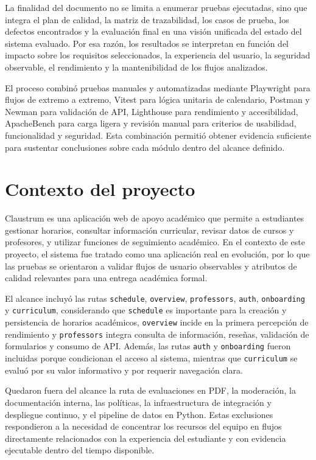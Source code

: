 \documentclass[11pt,spanish]{article}
\begin{document}
La finalidad del documento no se limita a enumerar pruebas ejecutadas, sino que integra el plan de calidad, la matriz de trazabilidad, los casos de prueba, los defectos encontrados y la evaluación final en una visión unificada del estado del sistema evaluado. Por esa razón, los resultados se interpretan en función del impacto sobre los requisitos seleccionados, la experiencia del usuario, la seguridad observable, el rendimiento y la mantenibilidad de los flujos analizados.

El proceso combinó pruebas manuales y automatizadas mediante Playwright para flujos de extremo a extremo, Vitest para lógica unitaria de calendario, Postman y Newman para validación de API, Lighthouse para rendimiento y accesibilidad, ApacheBench para carga ligera y revisión manual para criterios de usabilidad, funcionalidad y seguridad. Esta combinación permitió obtener evidencia suficiente para sustentar conclusiones sobre cada módulo dentro del alcance definido.

\section{Contexto del proyecto}

Claustrum es una aplicación web de apoyo académico que permite a estudiantes gestionar horarios, consultar información curricular, revisar datos de cursos y profesores, y utilizar funciones de seguimiento académico. En el contexto de este proyecto, el sistema fue tratado como una aplicación real en evolución, por lo que las pruebas se orientaron a validar flujos de usuario observables y atributos de calidad relevantes para una entrega académica formal.

El alcance incluyó las rutas \texttt{schedule}, \texttt{overview}, \texttt{professors}, \texttt{auth}, \texttt{onboarding} y \texttt{curriculum}, considerando que \texttt{schedule} es importante para la creación y persistencia de horarios académicos, \texttt{overview} incide en la primera percepción de rendimiento y \texttt{professors} integra consulta de información, reseñas, validación de formularios y consumo de API. Además, las rutas \texttt{auth} y \texttt{onboarding} fueron incluidas porque condicionan el acceso al sistema, mientras que \texttt{curriculum} se evaluó por su valor informativo y por requerir navegación clara.

Quedaron fuera del alcance la ruta de evaluaciones en PDF, la moderación, la documentación interna, las políticas, la infraestructura de integración y despliegue continuo, y el pipeline de datos en Python. Estas exclusiones respondieron a la necesidad de concentrar los recursos del equipo en flujos directamente relacionados con la experiencia del estudiante y con evidencia ejecutable dentro del tiempo disponible.
\end{document}
